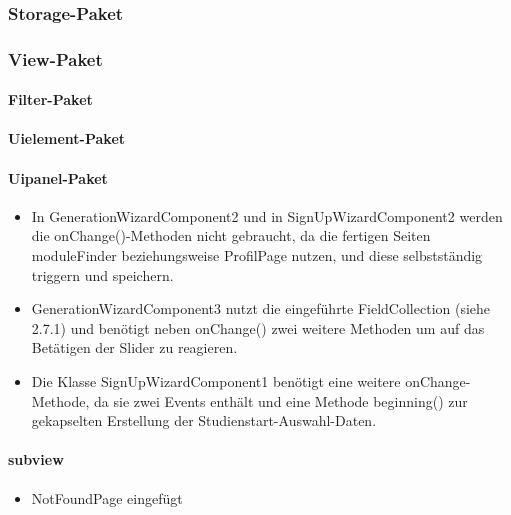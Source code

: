 \subsubsection{Storage-Paket}
\subsubsection{View-Paket}

\paragraph{Filter-Paket}

\paragraph{Uielement-Paket}

\paragraph{Uipanel-Paket} 
\begin{itemize}
\item In GenerationWizardComponent2 und in SignUpWizardComponent2 werden die onChange()-Methoden nicht gebraucht, da die fertigen Seiten moduleFinder beziehungsweise ProfilPage nutzen, und diese selbstständig triggern und speichern. 
\item GenerationWizardComponent3 nutzt die eingeführte FieldCollection (siehe 2.7.1) und benötigt neben onChange() zwei weitere Methoden um auf das Betätigen der Slider zu reagieren.
\item Die Klasse SignUpWizardComponent1 benötigt eine weitere onChange-Methode, da sie zwei Events enthält und eine Methode beginning() zur gekapselten Erstellung der Studienstart-Auswahl-Daten.
\end{itemize}

\paragraph{subview}
\begin{itemize}
\item NotFoundPage eingefügt
\end{itemize}



